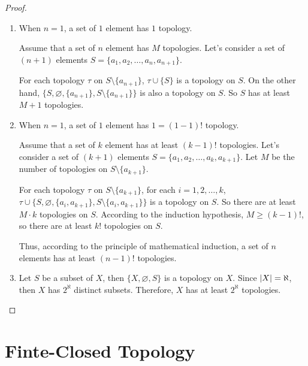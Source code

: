 \begin{proof}
    \begin{enumerate}[label={(\roman*)}]
        \item When $n = 1$, a set of $1$ element has $1$ topology.

              Assume that a set of $n$ element has $M$ topologies. Let's consider a set of $(n+1)$ elements $S = \{ a_{1}, a_{2}, \ldots, a_{n}, a_{n+1} \}$.

              For each topology $\tau$ on $S\setminus\{ a_{n+1} \}$, $\tau\cup\{ S \}$ is a topology on $S$. On the other hand, $\{ S, \varnothing, \{ a_{n+1} \}, S\setminus\{ a_{n+1} \} \}$ is also a topology on $S$. So $S$ has at least $M+1$ topologies.
        \item When $n = 1$, a set of $1$ element has $1 = (1-1){!}$ topology.

              Assume that a set of $k$ element has at least $(k-1){!}$ topologies. Let's consider a set of $(k+1)$ elements $S = \{ a_{1}, a_{2}, \ldots, a_{k}, a_{k+1} \}$. Let $M$ be the number of topologies on $S\setminus\{a_{k+1}\}$.

              For each topology $\tau$ on $S\setminus\{ a_{k+1} \}$, for each $i = 1, 2, \ldots, k$, $\tau\cup\{ S, \varnothing, \{ a_{i}, a_{k+1} \}, S\setminus\{ a_{i}, a_{k+1} \} \}$ is a topology on $S$. So there are at least $M\cdot k$ topologies on $S$. According to the induction hypothesis, $M\geq (k-1){!}$, so there are at least $k{!}$ topologies on $S$.

              Thus, according to the principle of mathematical induction, a set of $n$ elements has at least $(n-1){!}$ topologies.
        \item Let $S$ be a subset of $X$, then $\{ X, \varnothing, S \}$ is a topology on $X$. Since $\left\vert{X}\right\vert = \aleph$, then $X$ has $2^{\aleph}$ distinct subsets. Therefore, $X$ has at least $2^{\aleph}$ topologies.
    \end{enumerate}
\end{proof}
\newpage

\section{Finte-Closed Topology}
